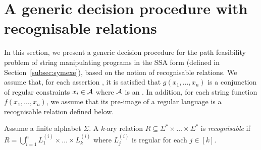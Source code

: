 

\section{A generic decision procedure with recognisable relations} \label{sec:algo}

In this section,  we present a generic decision procedure for the path feasibility problem %
of string manipulating programs in the SSA form (defined in Section~\ref{subsec:symexe}), 
based on the notion of recognisable relations. We assume that, for each assertion , it is satisfied that $g(x_1,\ldots,x_n)$ is a conjunction of regular constraints
 $x_i \in \mathcal{A}$ where $\mathcal{A}$ is an \FA{}.   
%
%
In addition, for each string function $f(x_1,\ldots,x_n)$, we assume that its pre-image of a regular language is a recognisable relation defined below.  

\begin{definition}
	Assume a finite alphabet $\Sigma$. A $k$-ary relation $R\subseteq \Sigma^*\times \ldots\times \Sigma^*$ is \emph{recognisable}  if $R=\bigcup_{i=1}^n L^{(i)}_1\times \ldots\times L^{(i)}_k$ where $L^{(i)}_j$ is regular for each $j\in [k]$.
%
\end{definition}


